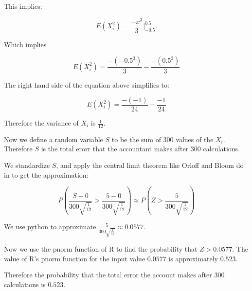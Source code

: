 \documentclass[a4paper,11pt]{article}
\begin{document}
This implies:

\begin{equation}
  E\left(X_i^2 \right) = \frac{-x^3}{3} \bigg\rvert_{-0.5}^{0.5}.
\end{equation}

Which implies

\begin{equation}
  E\left(X_i^2 \right) = \frac{-\left(-0.5^3 \right)}{3}
  - \frac{-\left(0.5^3 \right)}{3}
\end{equation}

The right hand side of the equation above simplifies to:

\begin{equation}
  E\left(X_i^2 \right) = \frac{-\left(-1 \right)}{24}
  - \frac{-1}{24}
\end{equation}

Therefore the variance of $X_i$ is $\frac{1}{12}$.

Now we define a random variable $S$ to be the sum of 300 values of the $X_i$.
Therefore $S$ is the total erorr that the accountant makes after 300
calculations.

We standardize $S$, and apply the central limit theorem like Orloff and
Bloom do in \cite{reading6b} to get the approximation:

\begin{equation}
P \left( \frac{S-0}{300 \sqrt{\frac{1}{12}}} > \frac{5-0}{300 \sqrt{\frac{1}{12}}} \right)
  \approx P\left(Z > \frac{5}{300 \sqrt{\frac{1}{12}}} \right)
\end{equation}

We use python to approximate $\frac{5}{300 \sqrt{\frac{1}{12}}} \approx 0.0577$.

Now we use the pnorm function of R to find the probability that $Z > 0.0577$.  The
value of R's pnorm function for the input value $0.0577$ is approximately $0.523$.

Therefore the probability that the total error the account makes after 300 calculations
is $0.523$.

\printbibliography{}
\end{document}
